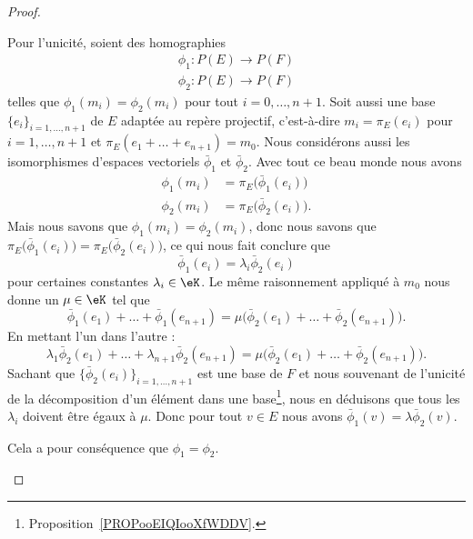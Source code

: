 \begin{proof}
\begin{subproof}
            Pour l'unicité, soient des homographies
            \begin{subequations}
                \begin{align}
                    \phi_1\colon P(E)\to P(F)\\
                    \phi_2\colon P(E)\to P(F)
                \end{align}
            \end{subequations}
            telles que \( \phi_1(m_i)=\phi_2(m_i)\) pour tout \( i=0,\ldots, n+1\). Soit aussi une base \( \{ e_i \}_{i=1,\ldots, n+1}\) de \( E\) adaptée au repère projectif, c'est-à-dire \( m_i=\pi_E(e_i)\) pour \( i=1,\ldots, n+1\) et \( \pi_E(e_1+\ldots +e_{n+1})=m_0\). Nous considérons aussi les isomorphismes d'espaces vectoriels \( \bar\phi_1\) et \( \bar\phi_2\). Avec tout ce beau monde nous avons
            \begin{subequations}
                \begin{align}
                    \phi_1(m_i)&=\pi_E\big( \bar\phi_1(e_i) \big)\\
                    \phi_2(m_i)&=\pi_E\big( \bar\phi_2(e_i) \big).
                \end{align}
            \end{subequations}
            Mais nous savons que \( \phi_1(m_i)=\phi_2(m_i)\), donc nous savons que \( \pi_E\big( \bar\phi_1(e_i) \big)=\pi_E\big( \bar\phi_2(e_i) \big)\), ce qui nous fait conclure que
            \begin{equation}
                \bar\phi_1(e_i)=\lambda_i\bar\phi_2(e_i)
            \end{equation}
            pour certaines constantes \( \lambda_i\in \eK\). Le même raisonnement appliqué à \( m_0\) nous donne un \( \mu\in \eK\) tel que
            \begin{equation}
                \bar\phi_1(e_1)+\ldots +\bar\phi_1(e_{n+1})=\mu\big( \bar\phi_2(e_1)+\ldots +\bar\phi_2(e_{n+1}) \big).
            \end{equation}
            En mettant l'un dans l'autre :
            \begin{equation}
                \lambda_1\bar\phi_2(e_1)+\ldots +\lambda_{n+1}\bar\phi_2(e_{n+1})=\mu\big( \bar\phi_2(e_1)+\ldots +\bar\phi_2(e_{n+1}) \big).
            \end{equation}
            Sachant que \( \{ \bar\phi_2(e_i) \}_{i=1,\ldots, n+1}\) est une base de \( F\) et nous souvenant de l'unicité de la décomposition d'un élément dans une base\footnote{Proposition~\ref{PROPooEIQIooXfWDDV}.}, nous en déduisons que tous les \( \lambda_i\) doivent être égaux à \( \mu\). Donc pour tout \( v\in E\) nous avons \( \bar\phi_1(v)=\lambda\bar\phi_2(v)\).

            Cela a pour conséquence que \( \phi_1=\phi_2\).
    \end{subproof}
\end{proof}

